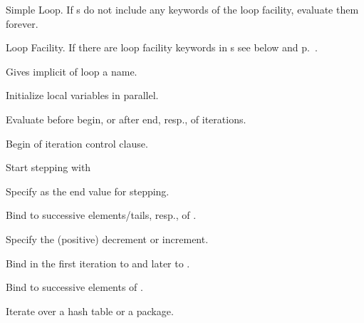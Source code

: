 \begin{LIST}{1cm}

  Simple Loop. If s do
  not include any keywords of the loop facility, evaluate them forever. 

  Loop Facility. If there are loop facility keywords in s
  see below and p.\ \pageref{loop-overview}.

  \begin{LIST}{.5cm}
    
    Gives implicit  of loop a name.

    Initialize local variables in parallel.

    Evaluate  before begin, or after end, resp., of iterations.

    Begin of iteration control clause.

    \begin{LIST}{.25cm}

      Start stepping with 

      Specify  as the end value for stepping.

      Bind  to successive elements/tails, resp., of .

      Specify the (positive) decrement or increment.

      Bind  in the first iteration to   and later to .

      Bind  to successive elements of .

      Iterate over a hash table or a package.

      \begin{LIST}{.5cm}


\end{LIST}
\end{LIST}
\end{LIST}
\end{LIST}
